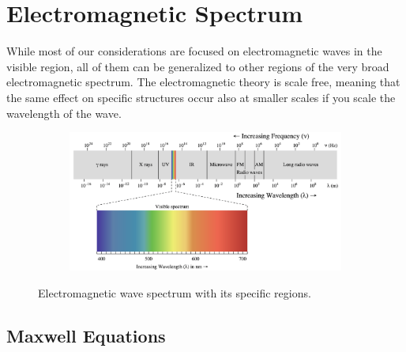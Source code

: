 \documentclass[
  a4paper,
]{book}
\begin{document}
\section{Electromagnetic Spectrum}\label{electromagnetic-spectrum}

While most of our considerations are focused on electromagnetic waves in
the visible region, all of them can be generalized to other regions of
the very broad electromagnetic spectrum. The electromagnetic theory is
scale free, meaning that the same effect on specific structures occur
also at smaller scales if you scale the wavelength of the wave.

\begin{figure}

\begin{minipage}{\linewidth}

\begin{figure}[H]

{\centering \includegraphics[width=0.9\linewidth,height=\textheight,keepaspectratio]{electromagnetic-waves/img/em_spectrum.png}

}


\end{figure}%

\end{minipage}%
\newline
\begin{minipage}{\linewidth}
Electromagnetic wave spectrum with its specific regions.\end{minipage}%

\end{figure}%

\subsection{Maxwell Equations}\label{maxwell-equations}
\end{document}
